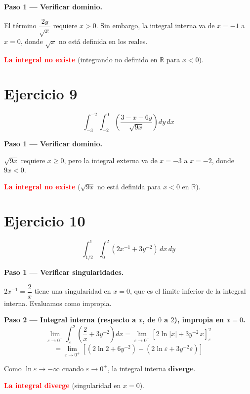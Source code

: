 \documentclass[12pt,a4paper]{article}
\begin{document}
\textbf{Paso 1 — Verificar dominio.}

El término $\dfrac{2y}{\sqrt{x}}$ requiere $x > 0$. Sin embargo, la integral interna va de $x = -1$ a $x = 0$, donde $\sqrt{x}$ no está definida en los reales.

\medskip
\textcolor{red}{\textbf{La integral no existe}} (integrando no definido en $\mathbb{R}$ para $x < 0$).

\bigskip
\section*{Ejercicio 9}
\[
  \int_{-3}^{-2} \int_{-2}^{0} \left(\frac{3 - x - 6y}{\sqrt{9x}}\right) dy \, dx
\]

\textbf{Paso 1 — Verificar dominio.}

$\sqrt{9x}$ requiere $x \geq 0$, pero la integral externa va de $x = -3$ a $x = -2$, donde $9x < 0$.

\medskip
\textcolor{red}{\textbf{La integral no existe}} ($\sqrt{9x}$ no está definida para $x < 0$ en $\mathbb{R}$).

\bigskip
\section*{Ejercicio 10}
\[
  \int_{1/2}^{1} \int_{0}^{2} (2x^{-1} + 3y^{-2}) \, dx \, dy
\]

\textbf{Paso 1 — Verificar singularidades.}

$2x^{-1} = \dfrac{2}{x}$ tiene una singularidad en $x=0$, que es el límite inferior de la integral interna. Evaluamos como impropia.

\textbf{Paso 2 — Integral interna (respecto a $x$, de $0$ a $2$), impropia en $x=0$.}
\[
  \lim_{\varepsilon\to 0^+}\int_{\varepsilon}^{2} \left(\frac{2}{x} + 3y^{-2}\right) dx
  = \lim_{\varepsilon\to 0^+}\left[2\ln|x| + 3y^{-2}\,x\right]_{\varepsilon}^{2}
\]
\[
  = \lim_{\varepsilon\to 0^+}\left[\left(2\ln 2 + 6y^{-2}\right) - \left(2\ln\varepsilon + 3y^{-2}\varepsilon\right)\right]
\]

Como $\ln\varepsilon \to -\infty$ cuando $\varepsilon \to 0^+$, la integral interna \textbf{diverge}.

\medskip
\textcolor{red}{\textbf{La integral diverge}} (singularidad en $x = 0$).
\end{document}
